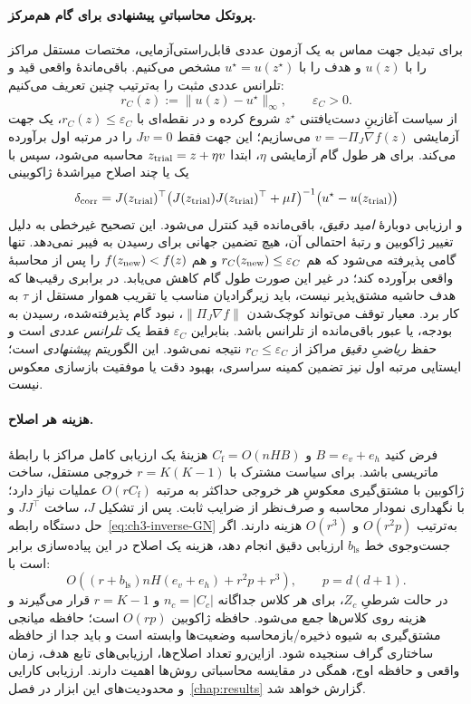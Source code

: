 \paragraph{پروتکل محاسباتیِ پیشنهادی برای گام هم‌مرکز.}
برای تبدیل جهت مماس به یک آزمون عددی قابل‌راستی‌آزمایی،
مختصات مستقل مراکز را با $u(z)$ و هدف را با
$u^\star=u(z^\star)$ مشخص می‌کنیم. باقی‌ماندهٔ واقعی قید
و تلرانس عددی مثبت را به‌ترتیب چنین تعریف می‌کنیم:
\begin{equation}\label{eq:ch3-fixed-center-residual}
r_C(z):=\|u(z)-u^\star\|_\infty,
\qquad \varepsilon_C>0.
\end{equation}
از سیاست آغازینِ دست‌یافتنی $z^\star$ شروع کرده و
در نقطه‌ای با $r_C(z)\le\varepsilon_C$،
یک جهت آزمایشی $v=-\Pi_J\nabla f(z)$
می‌سازیم؛ این جهت فقط $Jv=0$ را در مرتبه اول
برآورده می‌کند. برای هر طول گام آزمایشی $\eta$،
ابتدا $z_{\rm trial}=z+\eta v$ محاسبه می‌شود،
سپس با یک یا چند اصلاح میراشدهٔ ژاکوبینی
\[
\delta_{\rm corr}
=J(z_{\rm trial})^\top
\bigl(J(z_{\rm trial})J(z_{\rm trial})^\top+
\mu I\bigr)^{-1}
\bigl(u^\star-u(z_{\rm trial})\bigr)
\]
و ارزیابی دوبارهٔ \emph{امید دقیق}،
باقی‌مانده قید کنترل می‌شود.
این تصحیح غیرخطی به دلیل تغییر ژاکوبین
و رتبهٔ احتمالی آن، هیچ تضمین جهانی
برای رسیدن به فیبر نمی‌دهد.
تنها گامی پذیرفته می‌شود که هم
$r_C(z_{\rm new})\le\varepsilon_C$
و هم $f(z_{\rm new})<f(z)$
را پس از محاسبهٔ واقعی برآورده کند؛
در غیر این صورت طول گام کاهش می‌یابد.
در برابری رقیب‌ها که هدف حاشیه
مشتق‌پذیر نیست، باید زیرگرادیان مناسب
یا تقریب هموار مستقل از $\tau$ به کار برد.
معیار توقف می‌تواند کوچک‌شدن
$\|\Pi_J\nabla f\|$، نبود گام پذیرفته‌شده،
رسیدن به بودجه، یا عبور باقی‌مانده از
تلرانس باشد. بنابراین
$\varepsilon_C$ فقط یک \emph{تلرانس عددی}
است و حفظ \emph{ریاضیِ دقیق} مراکز
از $r_C\le\varepsilon_C$ نتیجه نمی‌شود.
این الگوریتم \emph{پیشنهادی} است؛
ایستایی مرتبه اول نیز تضمین کمینه سراسری،
بهبود دقت یا موفقیت بازسازی معکوس نیست.

\paragraph{هزینه هر اصلاح.}
فرض کنید $B=e_v+e_h$ و $C_{\mathrm f}=O(nHB)$ هزینهٔ یک ارزیابی کامل مراکز با رابطهٔ ماتریسی باشد. برای سیاست مشترک با $r=K(K-1)$ خروجی مستقل، ساخت ژاکوبین با مشتق‌گیری معکوسِ هر خروجی حداکثر به مرتبه $O(rC_{\mathrm f})$ عملیات نیاز دارد؛ با نگهداری نمودار محاسبه و صرف‌نظر از ضرایب ثابت. پس از تشکیل $J$، ساخت $JJ^\top$ و حل دستگاه رابطه~\eqref{eq:ch3-inverse-GN} به‌ترتیب $O(r^2p)$ و $O(r^3)$ هزینه دارند. اگر جست‌وجوی خط $b_{\mathrm{ls}}$ ارزیابی دقیق انجام دهد، هزینه یک اصلاح در این پیاده‌سازی برابر است با:
\begin{equation}\label{eq:ch3-inverse-complexity}
\boxed{O\!\left((r+b_{\mathrm{ls}})nH(e_v+e_h)
+r^2p+r^3\right),\qquad
p=d(d+1).}
\end{equation}
در حالت شرطیِ $Z_c$، برای هر کلاس جداگانه $n_c=|C_c|$ و $r=K-1$ قرار می‌گیرند و هزینه روی کلاس‌ها جمع می‌شود. حافظه ژاکوبین $O(rp)$ است؛ حافظه میانجی مشتق‌گیری به شیوه ذخیره/بازمحاسبه وضعیت‌ها وابسته است و باید جدا از حافظه ساختاری گراف سنجیده شود. ازاین‌رو تعداد اصلاح‌ها، ارزیابی‌های تابع هدف، زمان واقعی و حافظه اوج، همگی در مقایسه محاسباتی روش‌ها اهمیت دارند. ارزیابی کارایی و محدودیت‌های این ابزار در فصل~\ref{chap:results} گزارش خواهد شد.


